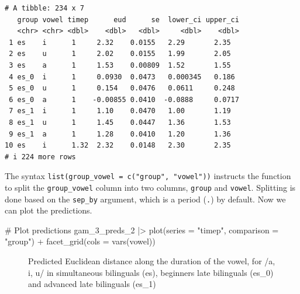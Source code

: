 \documentclass[
  letterpaper,
  DIV=11,
  numbers=noendperiod]{scrartcl}
\newenvironment{Shaded}{\begin{snugshade}}{\end{snugshade}}
\newcommand{\AttributeTok}[1]{\textcolor[rgb]{0.40,0.45,0.13}{#1}}
\newcommand{\CommentTok}[1]{\textcolor[rgb]{0.37,0.37,0.37}{#1}}
\newcommand{\FunctionTok}[1]{\textcolor[rgb]{0.28,0.35,0.67}{#1}}
\newcommand{\NormalTok}[1]{\textcolor[rgb]{0.00,0.23,0.31}{#1}}
\newcommand{\SpecialCharTok}[1]{\textcolor[rgb]{0.37,0.37,0.37}{#1}}
\newcommand{\StringTok}[1]{\textcolor[rgb]{0.13,0.47,0.30}{#1}}
\begin{document}
\begin{verbatim}
# A tibble: 234 x 7
   group vowel timep      eud      se  lower_ci upper_ci
   <chr> <chr> <dbl>    <dbl>   <dbl>     <dbl>    <dbl>
 1 es    i      1     2.32    0.0155   2.29       2.35  
 2 es    u      1     2.02    0.0155   1.99       2.05  
 3 es    a      1     1.53    0.00809  1.52       1.55  
 4 es_0  i      1     0.0930  0.0473   0.000345   0.186 
 5 es_0  u      1     0.154   0.0476   0.0611     0.248 
 6 es_0  a      1    -0.00855 0.0410  -0.0888     0.0717
 7 es_1  i      1     1.10    0.0470   1.00       1.19  
 8 es_1  u      1     1.45    0.0447   1.36       1.53  
 9 es_1  a      1     1.28    0.0410   1.20       1.36  
10 es    i      1.32  2.32    0.0148   2.30       2.35  
# i 224 more rows
\end{verbatim}

The syntax \texttt{list(group\_vowel\ =\ c("group",\ "vowel"))}
instructs the function to split the \texttt{group\_vowel} column into
two columns, \texttt{group} and \texttt{vowel}. Splitting is done based
on the \texttt{sep\_by} argument, which is a period (\texttt{.}) by
default. Now we can plot the predictions.

\begin{Shaded}
\begin{Highlighting}[]
\CommentTok{\# Plot predictions}
\NormalTok{gam\_3\_preds\_2 }\SpecialCharTok{|\textgreater{}}
  \FunctionTok{plot}\NormalTok{(}\AttributeTok{series =} \StringTok{"timep"}\NormalTok{, }\AttributeTok{comparison =} \StringTok{"group"}\NormalTok{) }\SpecialCharTok{+}
  \FunctionTok{facet\_grid}\NormalTok{(}\AttributeTok{cols =} \FunctionTok{vars}\NormalTok{(vowel))}
\end{Highlighting}
\end{Shaded}

\begin{figure}[H]


\caption{\label{fig-gam-3}Predicted Euclidean distance along the
duration of the vowel, for /a, i, u/ in simultaneous bilinguals (es),
beginners late bilinguals (es\_0) and advanced late bilinguals (es\_1)}

\end{figure}%
\end{document}
